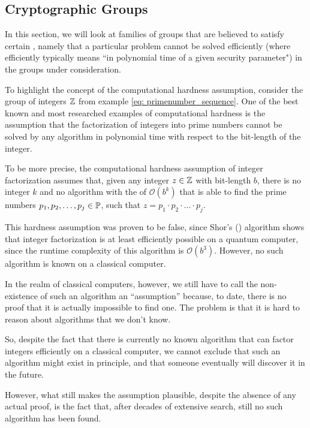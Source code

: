 
\subsection{Cryptographic Groups} In this section, we will look at families of groups that are believed to satisfy certain , namely that a particular problem cannot be solved efficiently (where efficiently typically means ``in polynomial time of a given security parameter") in the groups under consideration.
\begin{example}
To highlight the concept of the computational hardness assumption, consider the group of integers $\mathbb{Z}$ from example \ref{eq: primenumber_sequence}. One of the best known and most researched examples of computational hardness is the assumption that the factorization of integers into prime numbers cannot be solved by any algorithm in polynomial time with respect to the bit-length of the integer.

To be more precise, the computational hardness assumption of integer factorization assumes that, given any integer $z\in\mathbb{Z}$ with bit-length $b$, there is no integer $k$ and no algorithm with the  of $\mathcal{O}(b^k)$ that is able to find the prime numbers $p_1, p_2,\ldots,p_j\in\mathbb{P}$, such that $z=p_1\cdot p_2\cdot \ldots\cdot p_j$.

This hardness assumption was proven to be false, since Shor's (\citeyear{shor94}) algorithm shows that integer factorization is at least efficiently possible on a quantum computer, since the runtime complexity of this algorithm is $\mathcal{O}(b^3)$. However, no such algorithm is known on a classical computer.

In the realm of classical computers, however, we still have to call the non-existence of such an algorithm an ``assumption'' because, to date, there is no proof that it is actually impossible to find one. The problem is that it is hard to reason about algorithms that we don't know.

So, despite the fact that there is currently no known algorithm that can factor integers efficiently on a classical computer, we cannot exclude that such an algorithm might exist in principle, and that someone eventually will discover it in the future.

However, what still makes the assumption plausible, despite the absence of any actual proof, is the fact that, after decades of extensive search, still no such algorithm has been found.
\end{example}
